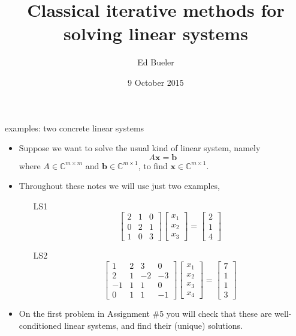 \documentclass[10pt,hyperref]{beamer}
\title{Classical iterative methods for solving linear systems}
\author{Ed Bueler}
\institute{MATH 614 Numerical Linear Algebra}
\date{9 October 2015}
\newcommand{\bb}{\mathbf{b}}
\newcommand{\bx}{\mathbf{x}}
\newcommand{\CC}{\mathbb{C}}
\begin{document}
\begin{frame}
  \maketitle
\end{frame}


\begin{frame}{examples: two concrete linear systems}

\begin{itemize}
\item Suppose we want to solve the usual kind of linear system, namely
\begin{equation}
A \bx = \bb \label{introsystem}
\end{equation}
where $A\in \CC^{m\times m}$ and $\bb\in \CC^{m\times 1}$, to find $\bx\in \CC^{m\times 1}$.
\item  Throughout these notes we will use just two examples,
  \begin{itemize}
  \item[LS1] 
\begin{equation*}
\begin{bmatrix} 2 & 1 & 0 \\
                0 & 2 & 1 \\
                1 & 0 & 3 \end{bmatrix}
\begin{bmatrix} x_1 \\ x_2 \\ x_3 \end{bmatrix}
=
\begin{bmatrix} 2 \\ 1 \\ 4 \end{bmatrix}
\end{equation*}
  \item[LS2]
\begin{equation*}
\begin{bmatrix} 1 & 2 & 3 & 0 \\
                2 & 1 &-2 &-3 \\
               -1 & 1 & 1 & 0 \\
                0 & 1 & 1 &-1 \end{bmatrix}
\begin{bmatrix} x_1 \\ x_2 \\ x_3 \\ x_4 \end{bmatrix}
=
\begin{bmatrix} 7 \\ 1 \\ 1 \\ 3 \end{bmatrix}
\end{equation*}
  \end{itemize}
\item On the first problem in Assignment \#5 you will check that these are well-conditioned linear systems, and find their (unique) solutions.
\end{itemize}
\end{frame}
\end{document}
